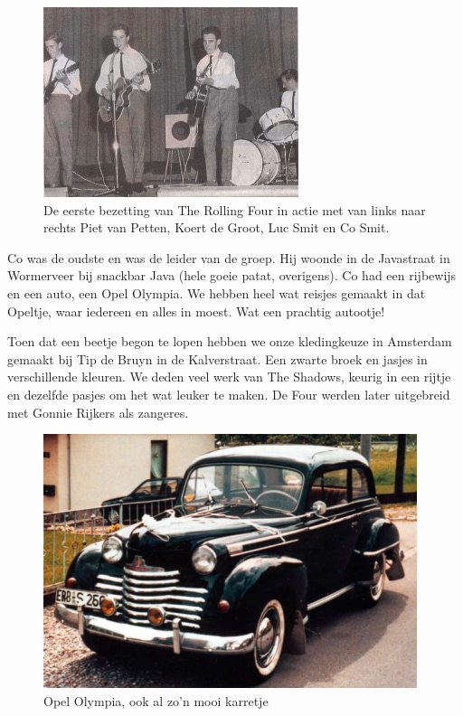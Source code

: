 \documentclass[12pt,twoside, openright]{memoir}
\begin{document}
\begin{figure}
\centering
\includegraphics[width=\textwidth]{img/ch33/four}
\caption*{\footnotesize De eerste bezetting van The Rolling Four in actie met van links naar rechts Piet van Petten, Koert de Groot, Luc Smit en Co Smit.}
\end{figure}

Co was de oudste en was de leider van de groep. Hij woonde in de Javastraat in Wormerveer bij snackbar Java (hele goeie patat, overigens). Co had een rijbewijs en een auto, een Opel Olympia. We hebben heel wat reisjes gemaakt in dat Opeltje, waar iedereen en alles in moest. Wat een prachtig autootje!

Toen dat een beetje begon te lopen hebben we onze kledingkeuze in Amsterdam gemaakt bij Tip de Bruyn in de Kalverstraat. Een zwarte broek en jasjes in verschillende kleuren. We deden veel werk van The Shadows, keurig in een rijtje en dezelfde pasjes om het wat leuker te maken. De Four werden later uitgebreid met Gonnie Rijkers als zangeres. 

\begin{figure}
\centering
\includegraphics[width=\textwidth]{img/ch26/opel_olympia_big}
\caption*{\footnotesize Opel Olympia, ook al zo'n mooi karretje}
\end{figure}
\end{document}
